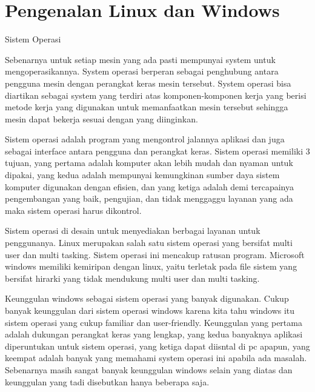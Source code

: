 
\section{Pengenalan Linux dan Windows}
Sistem Operasi

Sebenarnya untuk setiap mesin yang ada pasti mempunyai system untuk mengoperasikannya. System operasi berperan sebagai penghubung antara pengguna mesin dengan perangkat keras mesin tersebut. System operasi bisa diartikan sebagai system yang terdiri atas komponen-komponen kerja yang berisi metode kerja yang digunakan untuk memanfaatkan mesin tersebut sehingga mesin dapat bekerja sesuai dengan yang diinginkan.

Sistem operasi  adalah program yang mengontrol jalannya aplikasi dan juga sebagai interface antara pengguna dan perangkat keras. Sistem operasi memiliki 3 tujuan, yang pertama adalah komputer akan lebih mudah dan nyaman untuk dipakai, yang kedua adalah mempunyai kemungkinan sumber daya sistem komputer digunakan dengan efisien, dan yang ketiga adalah demi tercapainya pengembangan yang baik, pengujian, dan tidak menggaggu layanan yang ada maka sistem operasi harus dikontrol.

Sistem operasi di desain untuk menyediakan berbagai layanan untuk penggunanya. Linux merupakan salah satu sistem operasi yang bersifat multi user dan multi tasking. Sistem operasi ini mencakup ratusan program. Microsoft windows memiliki kemiripan dengan linux, yaitu terletak pada file sistem yang bersifat hirarki yang tidak mendukung multi user dan multi tasking.

Keunggulan windows sebagai sistem operasi yang banyak digunakan.
Cukup banyak keunggulan dari sistem operasi windows karena kita tahu windows itu sistem operasi yang cukup familiar dan user-friendly. Keunggulan yang pertama adalah dukungan perangkat keras yang lengkap, yang kedua banyaknya aplikasi diperuntukan untuk sistem operasi, yang ketiga dapat diisntal di pc apapun, yang keempat adalah banyak yang memahami system operasi ini apabila ada masalah. Sebenarnya masih sangat banyak keunggulan windows selain yang diatas dan keunggulan yang tadi disebutkan hanya beberapa saja.


